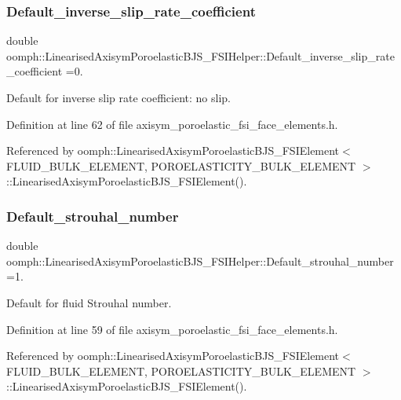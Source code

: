 \subsubsection{\texorpdfstring{Default\+\_\+inverse\+\_\+slip\+\_\+rate\+\_\+coefficient}{Default\_inverse\_slip\_rate\_coefficient}}
{\footnotesize\ttfamily double oomph\+::\+Linearised\+Axisym\+Poroelastic\+B\+J\+S\+\_\+\+F\+S\+I\+Helper\+::\+Default\+\_\+inverse\+\_\+slip\+\_\+rate\+\_\+coefficient =0.}



Default for inverse slip rate coefficient\+: no slip. 



Definition at line 62 of file axisym\+\_\+poroelastic\+\_\+fsi\+\_\+face\+\_\+elements.\+h.



Referenced by oomph\+::\+Linearised\+Axisym\+Poroelastic\+B\+J\+S\+\_\+\+F\+S\+I\+Element$<$ F\+L\+U\+I\+D\+\_\+\+B\+U\+L\+K\+\_\+\+E\+L\+E\+M\+E\+N\+T, P\+O\+R\+O\+E\+L\+A\+S\+T\+I\+C\+I\+T\+Y\+\_\+\+B\+U\+L\+K\+\_\+\+E\+L\+E\+M\+E\+N\+T $>$\+::\+Linearised\+Axisym\+Poroelastic\+B\+J\+S\+\_\+\+F\+S\+I\+Element().

\mbox{\label{namespaceoomph_1_1LinearisedAxisymPoroelasticBJS__FSIHelper_a5988e6ecbc965011c4cfded713ec68a0}} 
\subsubsection{\texorpdfstring{Default\+\_\+strouhal\+\_\+number}{Default\_strouhal\_number}}
{\footnotesize\ttfamily double oomph\+::\+Linearised\+Axisym\+Poroelastic\+B\+J\+S\+\_\+\+F\+S\+I\+Helper\+::\+Default\+\_\+strouhal\+\_\+number =1.}



Default for fluid Strouhal number. 



Definition at line 59 of file axisym\+\_\+poroelastic\+\_\+fsi\+\_\+face\+\_\+elements.\+h.



Referenced by oomph\+::\+Linearised\+Axisym\+Poroelastic\+B\+J\+S\+\_\+\+F\+S\+I\+Element$<$ F\+L\+U\+I\+D\+\_\+\+B\+U\+L\+K\+\_\+\+E\+L\+E\+M\+E\+N\+T, P\+O\+R\+O\+E\+L\+A\+S\+T\+I\+C\+I\+T\+Y\+\_\+\+B\+U\+L\+K\+\_\+\+E\+L\+E\+M\+E\+N\+T $>$\+::\+Linearised\+Axisym\+Poroelastic\+B\+J\+S\+\_\+\+F\+S\+I\+Element().

